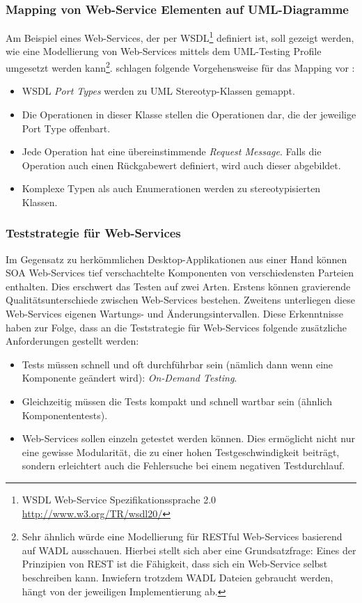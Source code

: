 \subsubsection{Mapping von Web-Service Elementen auf UML-Diagramme}
Am Beispiel eines Web-Services, der per WSDL\footnote{WSDL Web-Service Spezifikationssprache 2.0 \url{http://www.w3.org/TR/wsdl20/}} definiert ist, soll gezeigt werden, wie eine Modellierung von Web-Services mittels dem UML-Testing Profile umgesetzt werden kann\footnote{Sehr ähnlich würde eine Modellierung für RESTful Web-Services basierend auf WADL ausschauen. Hierbei stellt sich aber eine Grundsatzfrage: Eines der Prinzipien von REST ist die Fähigkeit, dass sich ein Web-Service selbst beschreiben kann. Inwiefern trotzdem WADL Dateien gebraucht werden, hängt von der jeweiligen Implementierung ab.}. \citeauthor{_model-driven_2007} schlagen folgende Vorgehensweise für das Mapping vor \cite{_model-driven_2007}:

\begin{itemize}
\item WSDL \textit{Port Types} werden zu \Gls{UML} Stereotyp-Klassen gemappt.
\item Die Operationen in dieser Klasse stellen die Operationen dar, die der jeweilige Port Type offenbart.
\item Jede Operation hat eine übereinstimmende \textit{Request Message}. Falls die Operation auch einen Rückgabewert definiert, wird auch dieser abgebildet.
\item Komplexe Typen als auch Enumerationen werden zu stereotypisierten Klassen.
\end{itemize}

\subsubsection{Teststrategie für Web-Services}
Im Gegensatz zu herkömmlichen Desktop-Applikationen aus einer Hand können SOA Web-Services tief verschachtelte Komponenten von verschiedensten Parteien enthalten. Dies erschwert das Testen auf zwei Arten. Erstens können gravierende Qualitätsunterschiede zwischen Web-Services bestehen. Zweitens unterliegen diese Web-Services eigenen Wartungs- und Änderungsintervallen. Diese Erkenntnisse haben zur Folge, dass an die Teststrategie für Web-Services folgende zusätzliche Anforderungen gestellt werden:

\begin{itemize}
\item Tests müssen schnell und oft durchführbar sein (nämlich dann wenn eine Komponente geändert wird): \textit{On-Demand Testing}.
\item Gleichzeitig müssen die Tests kompakt und schnell wartbar sein (ähnlich Komponententests).
\item Web-Services sollen einzeln getestet werden können. Dies ermöglicht nicht nur eine gewisse Modularität, die zu einer hohen Testgeschwindigkeit beiträgt, sondern erleichtert auch die Fehlersuche bei einem negativen Testdurchlauf.
\end{itemize}


